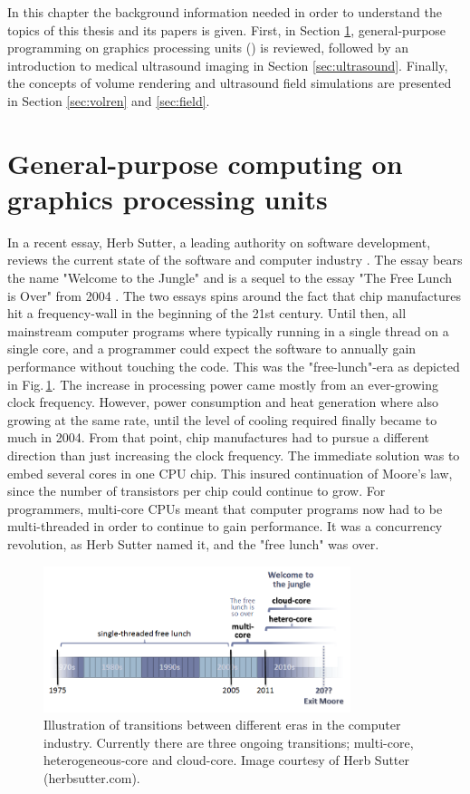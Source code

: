 %

In this chapter the background information needed in order to understand the topics of this thesis and its papers is given. First, in Section \ref{sec:gpgpu}, general-purpose programming on graphics processing units () is reviewed, followed by an introduction to medical ultrasound imaging in Section \ref{sec:ultrasound}. Finally, the concepts of volume rendering and ultrasound field simulations are presented in Section \ref{sec:volren} and \ref{sec:field}.

\section{General-purpose computing on graphics processing units}\label{sec:gpgpu}
In a recent essay, Herb Sutter, a leading authority on software development, reviews the current state of the software and computer industry \cite{HerbSutter}. The essay bears the name "Welcome to the Jungle" and is a sequel to the essay "The Free Lunch is Over" from 2004 \cite{HerbSuttera}. The two essays spins around the fact that chip manufactures hit a frequency-wall in the beginning of the 21st century. Until then, all mainstream computer programs where typically running in a single thread on a single core, and a programmer could expect the software to annually gain performance without touching the code. This was the "free-lunch"-era as depicted in Fig.\,\ref{fig:jungle}. The increase in processing power came mostly from an ever-growing clock frequency. However, power consumption and heat generation where also growing at the same rate, until the level of cooling required finally became to much in 2004.  From that point, chip manufactures had to pursue a different direction  than just increasing the clock frequency. The immediate solution was to embed several cores in one CPU chip. This insured continuation of Moore's law, since the number of transistors per chip could continue to grow. For programmers, multi-core CPUs meant that computer programs now had to be multi-threaded in order to continue to gain performance. It was a concurrency revolution, as Herb Sutter named it, and  the "free lunch" was over.

\begin{figure}
\centering
\includegraphics[width=0.8\textwidth]{img/free_lunsh.png}
\caption{Illustration of transitions between different eras in the computer industry. Currently there are three ongoing transitions; multi-core, heterogeneous-core and cloud-core. Image courtesy of Herb Sutter (herbsutter.com).}
\label{fig:jungle}
\end{figure}

